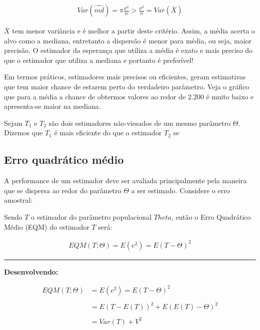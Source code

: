 \documentclass[
  letterpaper,
  DIV=11,
  numbers=noendperiod]{scrartcl}
\begin{document}
\[\begin{array}{ccc}
Var(\hat{md})=\pi \frac{\sigma^2}{n}>\frac{\sigma^2}{n}= Var(\bar{X}) 
\end{array}\]

\(\bar{X}\) tem menor variância e é melhor a partir deste critério.
Assim, a média acerta o alvo como a mediana, entretanto a dispersão é
menor para média, ou seja, maior precisão. O estimador da esperança que
utiliza a média é exato e mais preciso do que o estimador que utiliza a
mediana e portanto é preferível!

Em termos práticos, estimadores mais precisos ou eficientes, geram
estimativas que tem maior chance de estarem perto do verdadeiro
parâmetro. Veja o gráfico que para a média a chance de obtermos valores
ao redor de 2.200 é muito baixo e apresenta-se maior na mediana.

\begin{definicao}

Sejam \(T_1\) e \(T_2\) são dois estimadores não-viesados de um mesmo
parâmetro \(\Theta\). Dizemos que \(T_1\) é mais eficiente do que o
estimador \(T_2\) se \vspace{0.7cm} 

\end{definicao}

\subsection{Erro quadrático médio}\label{erro-quadruxe1tico-muxe9dio}

A performance de um estimador deve ser avaliada principalmente pela
maneira que se dispersa ao redor do parâmetro \(\Theta\) a ser estimado.
Considere o erro amostral:



\begin{definicao}

Sendo \(T\) o estimador do parâmetro populacional \(Theta\), então o
Erro Quadrático Médio (EQM) do estimador \(T\) será:

\[\begin{array}{ccc}
EQM(T;\Theta) = E(e^{2})= E(T-\Theta)^{2}
\end{array}\]

\begin{center}\rule{0.5\linewidth}{0.5pt}\end{center}

\textbf{Desenvolvendo:}

\[\begin{array}{ll}
EQM(T;\Theta) &= E(e^{2})=E(T-\Theta)^{2}
\\
\\
&= E(T-E(T))^{2}+ E(E(T)-\Theta)^{2}
\\
\\
&= Var (T) + V^{2}
\end{array}\]

\end{definicao}
\end{document}
